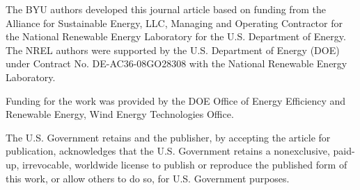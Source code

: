 \documentclass[wes, manuscript]{copernicus}
\begin{document}














\begin{acknowledgements}
The BYU authors developed this journal article based on funding from the Alliance for Sustainable Energy, LLC, Managing and Operating Contractor for the National Renewable Energy Laboratory for the U.S. Department of Energy.  The NREL authors were supported by the U.S. Department of Energy (DOE) under Contract No. DE-AC36-08GO28308 with the National Renewable Energy Laboratory.

Funding for the work was provided by the DOE Office of Energy Efficiency and Renewable Energy, Wind Energy Technologies Office.

The U.S. Government retains and the publisher, by accepting the article for publication, acknowledges that the U.S. Government retains a nonexclusive, paid-up, irrevocable, worldwide license to publish or reproduce the published form of this work, or allow others to do so, for U.S. Government purposes.
\end{acknowledgements}
\end{document}
